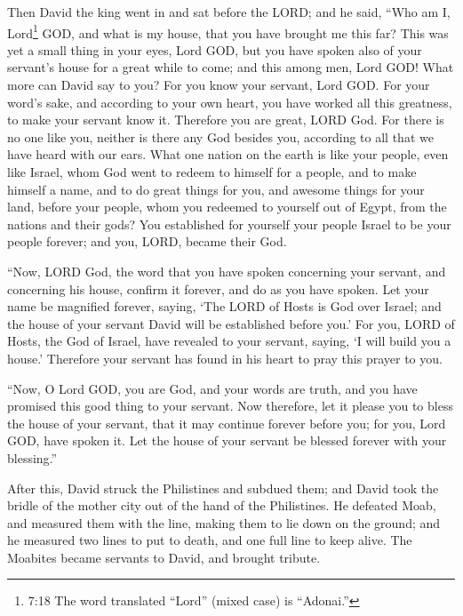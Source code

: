 \myverse{}Then David the king went in and sat before the LORD; and he said,
“Who am I, Lord\footnote{7:18 The word translated “Lord” (mixed case) is “Adonai.”} GOD, and what is my house, that
you have brought me this far?
\myverse{}This was yet a small thing in your eyes, Lord GOD, but you have spoken also
of your servant’s house for a great while to come; and this among men, Lord GOD!
\myverse{}What more can David say to you? For you know your servant, Lord GOD.
\myverse{}For your word’s sake, and according to your own heart, you have worked all
this greatness, to make your servant know it.
\myverse{}Therefore you are great, LORD God. For there is no one like you, neither is
there any God besides you, according to all that we have heard with our ears.
\myverse{}What one nation on the earth is like your people, even like Israel, whom God
went to redeem to himself for a people, and to make himself a name, and to do great things for you, and
awesome things for your land, before your people, whom you redeemed to yourself out of Egypt, from the
nations and their gods?
\myverse{}You established for yourself your people Israel to be your people forever;
and you, LORD, became their God.

\myverse{}“Now, LORD God, the word that you have spoken concerning your
servant, and concerning his house, confirm it forever, and do as you have spoken.
\myverse{}Let your name be magnified forever, saying, ‘The LORD of Hosts is God over
Israel; and the house of your servant David will be established before you.’
\myverse{}For you, LORD of Hosts, the God of Israel, have revealed to your servant,
saying, ‘I will build you a house.’ Therefore your servant has found in his heart to pray this prayer
to you.

\myverse{}“Now, O Lord GOD, you are God, and your words are truth, and
you have promised this good thing to your servant.
\myverse{}Now therefore, let it please you to bless the house of your servant, that
it may continue forever before you; for you, Lord GOD, have spoken it. Let the house of your servant be
blessed forever with your blessing.”


\mychapter{} \myverse*{}After this, David struck the Philistines and subdued them; and
David took the bridle of the mother city out of the hand of the Philistines.
\myverse{}He defeated Moab, and measured them with the line, making them to lie down on
the ground; and he measured two lines to put to death, and one full line to keep alive. The Moabites became
servants to David, and brought tribute.

